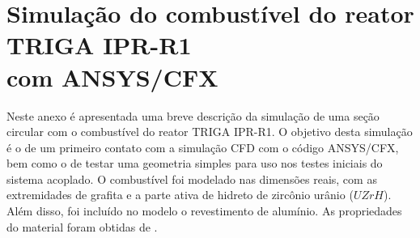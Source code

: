 \documentclass[12pt,openright,twoside,a4paper,english,french,spanish,brazil]{abntex2}
\begin{document}





\begin{anexosenv}

\partanexos


\label{ane:INAC2013}

%
%

\section*{Simulação do combustível do reator TRIGA IPR-R1 \\ com ANSYS/CFX}
\label{ane:simfuel}

Neste anexo é apresentada uma breve descrição da simulação de uma seção circular com o combustível do reator TRIGA IPR-R1. O objetivo desta simulação é o de um primeiro contato com a simulação CFD com o código ANSYS/CFX, bem como o de testar uma geometria simples para uso nos testes iniciais do sistema acoplado.
O combustível foi modelado nas dimensões reais, com as extremidades de grafita e a parte ativa de hidreto de zircônio urânio ($UZrH$). Além disso, foi incluído no modelo o revestimento de alumínio. As propriedades do material foram obtidas de \cite{Veloso2005}.


\end{anexosenv}
\end{document}
